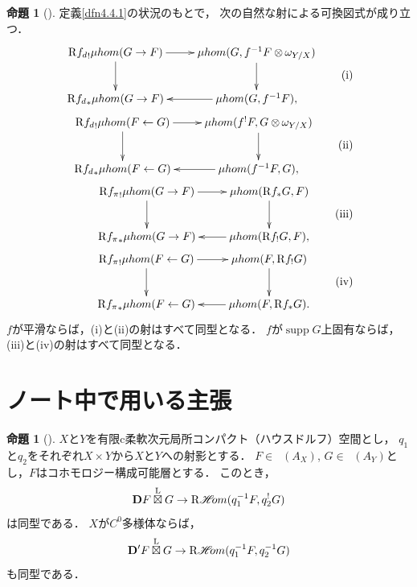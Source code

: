 \documentclass[leqno, 10pt, a4paper, dvipdfmx]{jsarticle}
\theoremstyle{definition}
\numberwithin{equation}{section}
\newcommand{\supp}{\mathop{\mathrm{supp}}\nolimits}
\newcommand{\Dompb}{\mathop{\mathsf{D}^\mathrm{b}}\nolimits}
\newcommand{\HOM}{\mathop{\mathscr{H}\hspace{-2pt}om}\nolimits}%
\newcommand{\RHOM}{\mathop{\mathrm{R}\hspace{-1.5pt}\HOM}\nolimits}
\newcommand{\Rder}{\mathrm{R}}
\newcommand{\vD}{\mathbf{D}}
\newcommand{\tens}[1][]{\mathbin{\otimes_{\raise1.5ex\hbox to-.1em{}{#1}}}}
\newcommand{\etens}{\mathbin{\boxtimes}}
\newcommand{\letens}{\overset{\mathrm{L}}{\etens}}
\theoremstyle{mystyle}
\newtheorem{PRP}[AXM]{命題}
\renewenvironment{leftbar}{%
  \def\FrameCommand{\textcolor{lightgray}{\vrule width 4pt} \hspace{10pt}}%
  \MakeFramed {\advance\hsize-\width \FrameRestore}}%
{\endMakeFramed}
\newcommand{\mpb}[1][]{{#1}_{\pi}} %
\newcommand{\mdiff}[1][]{{#1}_{d}} %
\newcommand{\muhom}{\mu hom}
\begin{document}
\begin{leftbar}
\begin{PRP}[{\cite[Prop.4.4.5]{KS90}}]\label{prp.4.4.5}
  定義\ref{dfn4.4.1}の状況のもとで，
  次の自然な射による可換図式が成り立つ．
  \begin{align}
    \vcenter{\xymatrix{
      \Rder{{\mdiff[f]}_{!}}\muhom(G\to F)
      \ar[r]
      \ar[d]
      &
      \muhom(G,f^{-1}F\tens[]\omega_{Y/X})
      \ar[d]
      \\
      \Rder{{\mdiff[f]}_{\ast}}\muhom(G\to F)
      &
      \muhom(G,f^{-1}F),
      \ar[l]
    }}\tag{i}\\
    \vcenter{\xymatrix{
      \Rder{{\mdiff[f]}_{!}}\muhom(F\leftarrow G)
      \ar[r]
      \ar[d]
      &
      \muhom(f^{!}F,G\tens[]\omega_{Y/X})
      \ar[d]
      \\
      \Rder{{\mdiff[f]}_{\ast}}\muhom(F\leftarrow G)
      &
      \muhom(f^{-1}F,G),
      \ar[l]
    }}\tag{ii}\\
    \vcenter{\xymatrix{
      \Rder{{\mpb[f]}_{!}}\muhom(G\to F)
      \ar[r]
      \ar[d]
      &
      \muhom(\Rder{f_{\ast}}G,F)
      \ar[d]
      \\
      \Rder{{\mpb[f]}_{\ast}}\muhom(G\to F)
      &
      \muhom(\Rder{f_{!}}G,F),
      \ar[l]
    }}\tag{iii}\\
    \vcenter{\xymatrix{
      \Rder{{\mpb[f]}_{!}}\muhom(F\leftarrow G)
      \ar[r]
      \ar[d]
      &
      \muhom(F,\Rder{f_{!}}G)
      \ar[d]
      \\
      \Rder{{\mpb[f]}_{\ast}}\muhom(F\leftarrow G)
      &
      \muhom(F,\Rder{f_{\ast}}G).
      \ar[l]
    }}\tag{iv}
  \end{align}
  \(f\)が平滑ならば，(i)と(ii)の射はすべて同型となる．
  \(f\)が\(\supp{G}\)上固有ならば，(iii)と(iv)の射はすべて同型となる．
\end{PRP}
\end{leftbar}


\clearpage
\appendix
\section{ノート中で用いる主張}
\begin{leftbar}
\begin{PRP}[{\cite[Prop.3.4.4.]{KS90}}]\label{prp3.4.4}
  \(X\)と\(Y\)を有限c柔軟次元局所コンパクト（ハウスドルフ）空間とし，
  \(q_1\)と\(q_2\)をそれぞれ\(X\times Y\)から\(X\)と\(Y\)への射影とする．
  \(F\in\Dompb(A_X)\), \(G\in\Dompb(A_Y)\)とし，\(F\)はコホモロジー構成可能層とする．
  このとき，
  \[
    \vD{F}\letens G\to \RHOM(q_1^{-1}F,q_2^{!}G)
  \]は同型である．
  \(X\)が\(C^0\)多様体ならば，\[
    \vD'{F}\letens G\to \RHOM(q_1^{-1}F,q_2^{-1}G)
  \]も同型である．
\end{PRP}
\end{leftbar}
\end{document}
